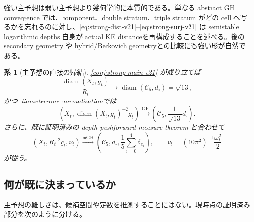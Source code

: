 \documentclass[11pt,a4paper]{ltjsarticle}
\newcommand{\cC}{\mathcal C}
\newcommand{\diam}{\operatorname{diam}}
\newcommand{\GH}{\mathrm{GH}}
\newcommand{\mGH}{\mathrm{mGH}}
\theoremstyle{plain}
\newtheorem{corollary}[conjecture]{系}
\theoremstyle{definition}
\theoremstyle{remark}
\begin{document}
強い主予想は弱い主予想より幾何学的に本質的である。単なる abstract GH convergence では、component、double stratum、triple stratum がどの cell へ写るかを忘れるのに対し、\eqref{eq:strong-dist-v21}--\eqref{eq:strong-surj-v21} は semistable logarithmic depths 自身が actual KE distanceを再構成することを述べる。後の secondary geometry や hybrid/Berkovich geometryとの比較にも強い形が自然である。

\begin{corollary}[主予想の直接の帰結]\label{cor:main-consequences-v21}
\cref{conj:strong-main-v21} が成り立てば
\[
 \frac{\diam(X_t,g_t)}{R_t}\longrightarrow\diam(\cC_5,d_\square)=\sqrt{13},
\]
かつ diameter-one normalizationでは
\[
 (X_t,\diam(X_t,g_t)^{-2}g_t)
 \xrightarrow{\GH}
 \left(\cC_5,\frac1{\sqrt{13}}d_\square\right).
\]
さらに、既に証明済みの depth-pushforward measure theorem と合わせて
\[
 (X_t,R_t^{-2}g_t,\nu_t)
 \xrightarrow{\mGH}
 \left(\cC_5,d_\square,\frac15\sum_{i=0}^4\delta_{e_i}\right),
 \qquad
 \nu_t=(10\pi^2)^{-1}\frac{\omega_t^2}{2}
\]
が従う。
\end{corollary}

\subsection{何が既に決まっているか}
主予想の難しさは、候補空間や定数を推測することにはない。現時点の証明済み部分を次のように分ける。
\end{document}
